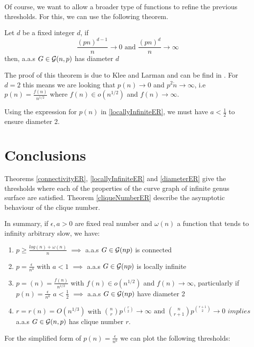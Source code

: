 Of course, we want to allow a broader type of functions to refine the previous thresholds. For this, we can use the following theorem.

\begin{theorem}\label{diameterER}
Let $d$ be a fixed integer $d$, if 
$$\frac{(pn)^{d-1}}{n} \to 0 \text{ and } \frac{(pn)^{d}}{n} \to \infty $$
then, a.a.s $G\in\mathcal{G}(n,p)$ has diameter $d$
\end{theorem}

The proof of this theorem is due to Klee and Larman and can be find in \cite[Klee, Larman 81]{diameters}. For $d=2$ this means we are looking that $p(n)\to 0$ and $p^2 \dot n\to \infty$, i.e $p(n)= \frac{f(n)}{n^{1/2}}$ where $f(n)\in o(n^{1/2})$ and $f(n)\to \infty$.

Using the expression for $p(n)$ in \ref{locallyInfiniteER}, we must have $a<\frac{1}{2}$ to ensure diameter 2.

\section{Conclusions}

Theorems \ref{connectivityER}, \ref{locallyInfiniteER} and \ref{diameterER} give the thresholds where each of the properties of the curve graph of infinite genus surface are satisfied. Theorem \ref{cliqueNumberER} describe the asymptotic behaviour of the clique number.

In summary, if $\epsilon, a > 0$ are fixed real number and $\omega(n)$ a function that tends to infinity arbitrary slow, we have:
\begin{enumerate}
    \item $p\geq \frac{log(n)+ \omega(n)}{n}$ $\implies$ a.a.s $G\in\mathcal{G}(np)$ is connected
    \item $p=\frac{\epsilon}{n^{a}}$ with $a<1$ $\implies$ a.a.s $G\in\mathcal{G}(np)$ is locally infinite
    \item $p=(n) = \frac{f(n)}{n^{1/2}}$ with $f(n)\in o(n^{1/2})$ and $f(n)\to \infty$, particularly if $p(n)=\frac{\epsilon}{n^{a}}$ $a<\frac{1}{2}$ $\implies$ a.a.s  $G\in\mathcal{G}(np)$ have diameter 2
    \item $r = r(n) = O(n^{1/3})$ with $\binom{n}{r} p^{\binom{r}{2}} \to \infty \text{ and } \binom{n}{r+1} p^{\binom{r+1}{2}} \to 0 $ $implies$ a.a.s $G\in\mathcal{G}(n,p)$ has clique number $r$.
\end{enumerate}

For the simplified form of $p(n) = \frac{\epsilon}{n^{a}}$ we can plot the following thresholds:

